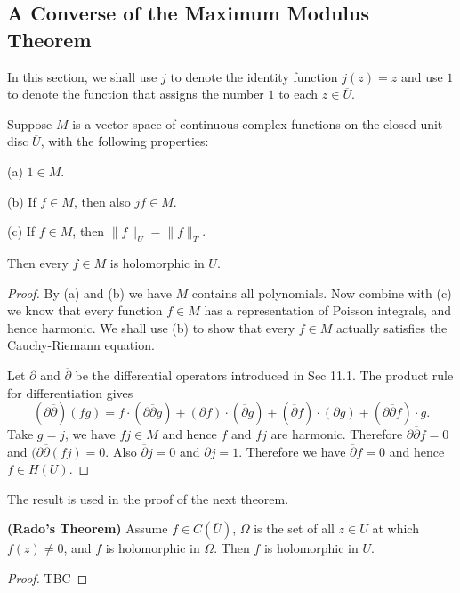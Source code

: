 \subsection{A Converse of the Maximum Modulus Theorem}
In this section, we shall use $j$ to denote the identity function $j(z)=z$ and use $1$ to denote the function that assigns the number $1$ to each $z\in\overline{U}$.
\begin{theorem}
Suppose $M$ is a vector space of continuous complex functions on the closed unit disc $\overline{U}$, with the following properties:\par
(a) $1\in M$.\par
(b) If $f\in M$, then also $jf\in M$.\par
(c) If $f\in M$, then $\|f\|_U=\|f\|_T$.\par
Then every $f\in M$ is holomorphic in $U$.
\end{theorem}
\begin{proof}
By (a) and (b) we have $M$ contains all polynomials. Now combine with (c) we know that every function $f\in M$ has a representation of Poisson integrals, and hence harmonic. We shall use (b) to show that every $f\in M$ actually satisfies the Cauchy-Riemann equation.\par
Let $\partial$ and $\overline{\partial}$ be the differential operators introduced in Sec 11.1. The product rule for differentiation gives 
$$
\left( \partial \overline{\partial } \right) \left( fg \right) =f\cdot \left( \partial \overline{\partial }g \right) +\left( \partial f \right) \cdot \left( \overline{\partial }g \right) +\left( \overline{\partial }f \right) \cdot \left( \partial g \right) +\left( \partial \overline{\partial }f \right) \cdot g.
$$
Take $g=j$, we have $fj\in M$ and hence $f$ and $fj$ are harmonic. Therefore $\partial\overline{\partial} f=0$ and $(\partial\overline{\partial}(fj)=0$. Also $\overline{\partial}j=0$ and $\partial j=1$. Therefore we have $\overline{\partial}f=0$ and hence $f\in H(U)$.
\end{proof}
The result is used in the proof of the next theorem.
\begin{theorem}{\textbf{(Rado's Theorem)}}
Assume $f\in C(\overline{U})$, $\Omega$ is the set of all $z\in U$ at which $f(z)\ne 0$, and $f$ is holomorphic in $\Omega$. Then $f$ is holomorphic in $U$.
\end{theorem}
\begin{proof}
TBC
\end{proof}